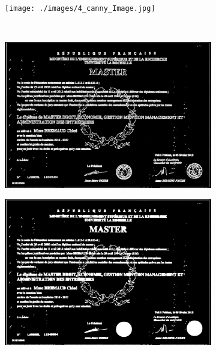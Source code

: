 \documentclass[runningheads]{llncs}
\begin{document}
\begin{figure}[h]
\begin{subfigure}[b]{0.28\textwidth}
		\caption{}
		\label{image_text_3}
	\end{subfigure}%
	\newline		
	\begin{subfigure}[b]{0.32\textwidth}
		\centering \texttt{[image: ./images/4\_canny\_Image.jpg]}
		\caption{}
		\label{image_text_4}
	\end{subfigure}
	~%
	\begin{subfigure}[b]{0.32\textwidth}
		\centering \includegraphics[trim = 97cm 55cm 97cm 73cm, clip,scale=0.073]{./images/5_canny_dialted_Image.jpg}
		\caption{}
		\label{image_text_5}
	\end{subfigure}		
	\begin{subfigure}[b]{0.32\textwidth}
		\centering \includegraphics[trim = 97cm 55cm 97cm 73cm, clip,scale=0.073]{./images/6_hole_filled_Image.jpg}

\end{subfigure}
\end{figure}
\end{document}
